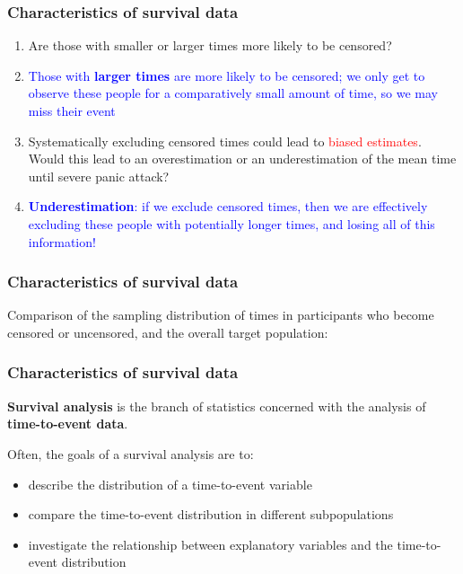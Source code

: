 \documentclass[12pt, 
hyperref={colorlinks=true, linkcolor=blue, urlcolor=cyan},dvipsnames]{beamer}
\begin{document}
\begin{frame}
\frametitle{Characteristics of survival data}
\begin{enumerate}
\item Are those with smaller or larger times more likely to be censored?
\item[] \textcolor{blue}{Those with \textbf{larger times} are more likely to be censored; we only get to observe these people for a comparatively small amount of time, so we may miss their event}
\item Systematically excluding censored times could lead to \textcolor{red}{biased estimates}. Would this lead to an overestimation or an underestimation of the mean time until severe panic attack?
\item[] \textcolor{blue}{\textbf{Underestimation}: if we exclude censored times, then we are effectively excluding these people with potentially longer times, and losing all of this information!}
\end{enumerate}

\end{frame}

\begin{frame}
\frametitle{Characteristics of survival data}
Comparison of the sampling distribution of times in participants who become censored or uncensored, and the overall target population:
\begin{center}

\end{center}
\end{frame}

\begin{frame}
\frametitle{Characteristics of survival data}
\textbf{Survival analysis} is the branch of statistics concerned with the analysis of \textbf{time-to-event data}.

Often, the goals of a survival analysis are to:
\begin{itemize}
\item describe the distribution of a time-to-event variable
\item compare the time-to-event distribution in different subpopulations
\item investigate the relationship between explanatory variables and the time-to-event distribution
\end{itemize}
\end{frame}
\end{document}
